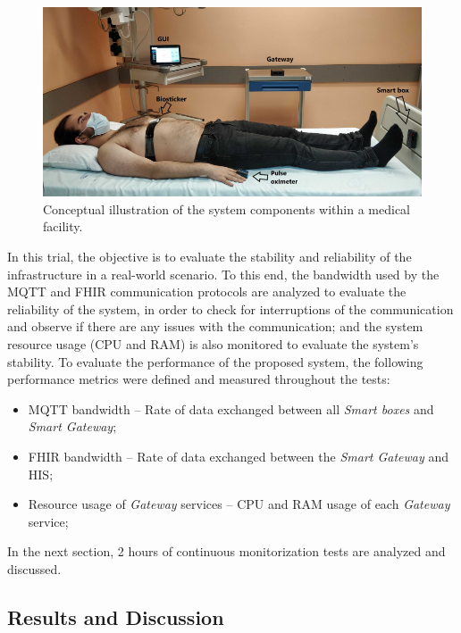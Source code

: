 \begin{figure}[H]
    \centering
    \includegraphics[width=\linewidth]{images/hospital-trial.png}
    \caption[Conceptual illustration of the system components within a medical facility.]{Conceptual illustration of the system components within a medical facility.}
    \label{fig:hospital-trial}
\end{figure}

In this trial, the objective is to evaluate the stability and reliability of the infrastructure in a real-world scenario. To this end, the bandwidth used by the \acs{MQTT} and \acs{FHIR} communication protocols are analyzed to evaluate the reliability of the system, in order to check for interruptions of the communication and observe if there are any issues with the communication; and the system resource usage (\acs{CPU} and \acs{RAM}) is also monitored to evaluate the system's stability. To evaluate the performance of the proposed system, the following performance metrics were defined and measured throughout the tests:

\begin{itemize}
    \item \acs{MQTT} bandwidth -- Rate of data exchanged between all \textit{Smart boxes} and \textit{Smart Gateway};
    \item \acs{FHIR} bandwidth -- Rate of data exchanged between the \textit{Smart Gateway} and \acs{HIS};
    \item Resource usage of \textit{Gateway} services -- \acs{CPU} and \acs{RAM} usage of each \textit{Gateway} service;
\end{itemize}

In the next section, 2 hours of continuous monitorization tests are analyzed and discussed. 

\subsection{Results and Discussion}

